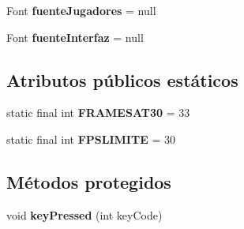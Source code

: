 \begin{DoxyCompactItemize}
\item 
\hypertarget{classBatallaEspacial_1_1Juego_ae40dd2e0877c965fe2a123b7e6277b92}{
Font {\bfseries fuenteJugadores} = null}
\label{classBatallaEspacial_1_1Juego_ae40dd2e0877c965fe2a123b7e6277b92}

\item 
\hypertarget{classBatallaEspacial_1_1Juego_ade21cbd820231da2f484c3c4127fa87e}{
Font {\bfseries fuenteInterfaz} = null}
\label{classBatallaEspacial_1_1Juego_ade21cbd820231da2f484c3c4127fa87e}

\end{DoxyCompactItemize}
\subsection*{Atributos públicos estáticos}
\begin{DoxyCompactItemize}
\item 
\hypertarget{classBatallaEspacial_1_1Juego_af23376bd0397d5524a9636000386b6ef}{
static final int {\bfseries FRAMESAT30} = 33}
\label{classBatallaEspacial_1_1Juego_af23376bd0397d5524a9636000386b6ef}

\item 
\hypertarget{classBatallaEspacial_1_1Juego_a87854cd06609c0127da626202eff4873}{
static final int {\bfseries FPSLIMITE} = 30}
\label{classBatallaEspacial_1_1Juego_a87854cd06609c0127da626202eff4873}

\end{DoxyCompactItemize}
\subsection*{Métodos protegidos}
\begin{DoxyCompactItemize}
\item 
\hypertarget{classBatallaEspacial_1_1Juego_ab0f0c1a20e01a82d995b475707d313d3}{
void {\bfseries keyPressed} (int keyCode)}
\label{classBatallaEspacial_1_1Juego_ab0f0c1a20e01a82d995b475707d313d3}

\end{DoxyCompactItemize}
